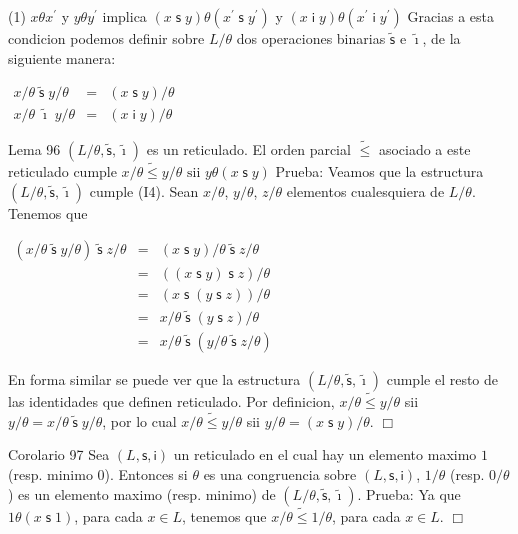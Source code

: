 (1) \(x\theta x^{\prime }\) y \(y\theta y^{\prime }\) implica \((x\mathsf{ \;s\;}y)\theta (x^{\prime }\mathsf{\;s\;}y^{\prime })\) y \((x\mathsf{\;i\;} y)\theta (x^{\prime }\mathsf{\;i\;}y^{\prime })\)
Gracias a esta condicion podemos definir sobre \(L/\theta \) dos operaciones binarias \(\mathsf{\tilde{s}}\) e \(\mathsf{\tilde{\imath}}\), de la siguiente manera:

\(\displaystyle \begin{array}{rcl} x/\theta \mathsf{\;\tilde{s}\;}y/\theta & =& (x\mathsf{\;s\;}y)/\theta \\ x/\theta \mathsf{\;\tilde{\imath}\;}y/\theta & =& (x\mathsf{\;i\;}y)/\theta \end{array} \)

Lema 96 \((L/\theta ,\mathsf{\tilde{s}},\mathsf{\tilde{\imath}})\) es un reticulado. El orden parcial \(\tilde{\leq}\) asociado a este reticulado cumple
\(\displaystyle x/\theta \tilde{\leq}y/\theta \text{ sii }y\theta (x\mathsf{\;s\;}y) \)
Prueba: Veamos que la estructura \((L/\theta ,\mathsf{\tilde{s}},\mathsf{\tilde{\imath }})\) cumple (I4). Sean \(x/\theta \), \(y/\theta \), \(z/\theta \) elementos cualesquiera de \(L/\theta \). Tenemos que

\(\displaystyle \begin{array}{ccl} (x/\theta \mathsf{\;\tilde{s}\;}y/\theta )\;\mathsf{\tilde{s}}\;z/\theta & = & (x\mathsf{\;s\;}y)/\theta \;\mathsf{\tilde{s}}\;z/\theta \\ & = & ((x\mathsf{\;s\;}y)\;\mathsf{s}\;z)/\theta \\ & = & (x\mathsf{\;s\;}(y\;\mathsf{s}\;z))/\theta \\ & = & x/\theta \;\mathsf{\tilde{s}}\;(y\;\mathsf{s}\;z)/\theta \\ & = & x/\theta \mathsf{\;\tilde{s}\;}(y/\theta \;\mathsf{\tilde{s}} \;z/\theta ) \end{array} \)

En forma similar se puede ver que la estructura \((L/\theta ,\mathsf{\tilde{s} },\mathsf{\tilde{\imath}})\) cumple el resto de las identidades que definen reticulado.
Por definicion, \(x/\theta \tilde{\leq}y/\theta \) sii \(y/\theta =x/\theta \mathsf{\;\tilde{s}\;}y/\theta \), por lo cual \(x/\theta \tilde{\leq}y/\theta \) sii \(y/\theta =(x\mathsf{\;s\;}y)/\theta \). \(\Box\)

Corolario 97 Sea \((L,\mathsf{s},\mathsf{i})\) un reticulado en el cual hay un elemento maximo \(1\) (resp. minimo \(0\)). Entonces si \(\theta \) es una congruencia sobre \((L,\mathsf{s},\mathsf{i})\), \(1/\theta \) (resp. \(0/\theta \)) es un elemento maximo (resp. minimo) de \((L/\theta ,\mathsf{\tilde{s}},\mathsf{ \tilde{\imath}})\).
Prueba: Ya que \(1\theta (x\mathsf{\;s\;}1)\), para cada \(x\in L\), tenemos que \( x/\theta \tilde{\leq}1/\theta \), para cada \(x\in L\). \(\Box\)

